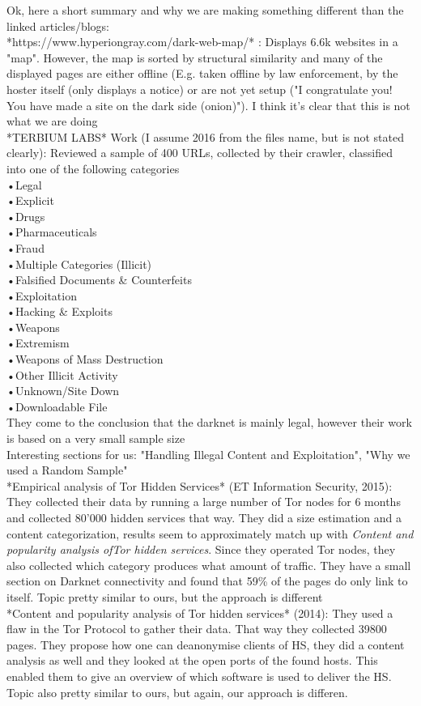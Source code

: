 \documentclass[USenglish,oneside,twocolumn]{article}
\begin{document}
Ok, here a short summary and why we are making something different than the linked articles/blogs: \\
*https://www.hyperiongray.com/dark-web-map/* : Displays 6.6k websites in a "map". However, the map is sorted by structural similarity and many of the displayed pages are either offline (E.g. taken offline by law enforcement, by the hoster itself (only displays a notice) or are not yet setup ("I congratulate you! You have made a site on the dark side (onion)"). I think it's clear that this is not what we are doing\\
*TERBIUM LABS* Work (I assume 2016 from the files name, but is not stated clearly): Reviewed a sample of 400 URLs, collected by their crawler, classified into one of the following categories\\
•Legal\\
•Explicit\\
•Drugs\\
•Pharmaceuticals\\
•Fraud\\
•Multiple Categories (Illicit)\\
•Falsified Documents & Counterfeits\\
•Exploitation\\
•Hacking & Exploits\\
•Weapons\\
•Extremism\\
•Weapons of Mass Destruction\\
•Other Illicit Activity \\
•Unknown/Site Down\\
•Downloadable File\\
They come to the conclusion that the darknet is mainly legal, however their work is based on a very small sample size\\
Interesting sections for us: "Handling Illegal Content and Exploitation", "Why we used a Random Sample"\\
*Empirical analysis of Tor Hidden Services* (ET Information Security, 2015): They collected their data by running a large number of Tor nodes for 6 months and collected 80'000 hidden services that way. They did a size estimation and a content categorization, results seem to approximately match up with \textit{Content and popularity analysis ofTor hidden services}. Since they operated Tor nodes, they also collected which category produces what amount of traffic. They have a small section on Darknet connectivity and found that 59\% of the pages do only link to itself.
Topic pretty similar to ours, but the approach is different \\   
*Content and popularity analysis of Tor hidden services* (2014): They used a flaw in the Tor Protocol to gather their data. That way they collected 39800 pages. They propose how one can deanonymise clients of HS, they did a content analysis as well and they looked at the open ports of the found hosts. This enabled them to give an overview of which software is used to deliver the HS.
Topic also pretty similar to ours, but again, our approach is differen.
\end{document}

